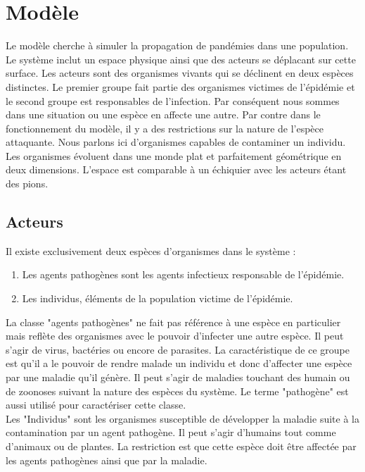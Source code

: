 \chapter{Modèle} \label{ch:modele}

Le modèle cherche à simuler la propagation de pandémies dans une population. Le système inclut un espace physique ainsi que des acteurs se déplacant sur cette surface. Les acteurs sont des organismes vivants qui se déclinent en deux espèces distinctes. Le premier groupe fait partie des organismes victimes de l'épidémie et le second groupe est responsables de l'infection. Par conséquent nous sommes dans une situation ou une espèce en affecte une autre. Par contre dans le fonctionnement du modèle, il y a des restrictions sur la nature de l'espèce attaquante. Nous parlons ici d'organismes capables de contaminer un individu. \\

Les organismes évoluent dans une monde plat et parfaitement géométrique en deux dimensions. L'espace est comparable à un échiquier avec les acteurs étant des pions.

\section{Acteurs}

Il existe exclusivement deux espèces d'organismes dans le système :

\begin{enumerate}
	\item Les agents pathogènes sont les agents infectieux responsable de l'épidémie.
	\item Les individus, éléments de la population victime de l'épidémie.
\end{enumerate}

La classe "agents pathogènes" ne fait pas référence à une espèce en particulier mais reflète des organismes avec le pouvoir d'infecter une autre espèce. Il peut s'agir de virus, bactéries ou encore de parasites. La caractéristique de ce groupe est qu'il a le pouvoir de rendre malade un individu et donc d'affecter une espèce par une maladie qu'il génère. Il peut s'agir de maladies touchant des humain ou de zoonoses suivant la nature des espèces du système. Le terme "pathogène" est aussi utilisé pour caractériser cette classe.\\

Les "Individus" sont les organismes susceptible de développer la maladie suite à la contamination par un agent pathogène. Il peut s'agir d'humains tout comme d'animaux ou de plantes. La restriction est que cette espèce doit être affectée par les agents pathogènes ainsi que par la maladie.

